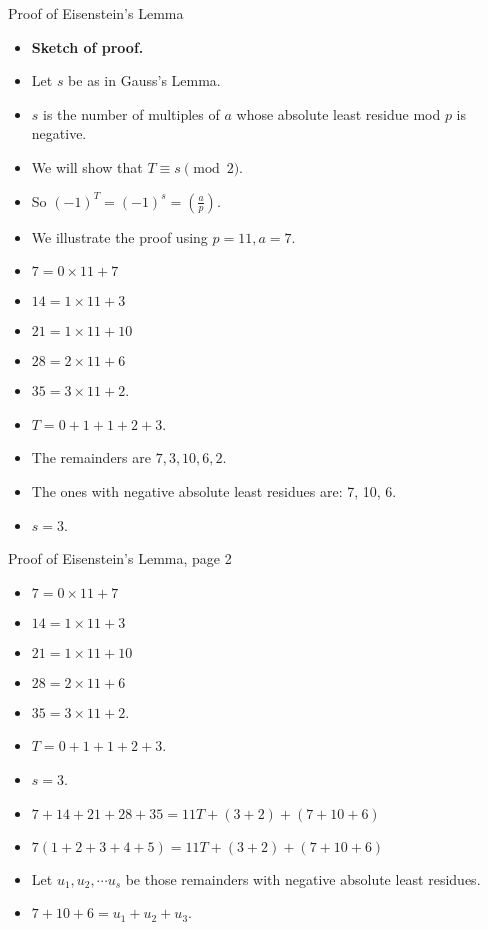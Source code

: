 \documentclass{beamer}
\begin{document}
\begin{frame}{Proof of Eisenstein's Lemma}

\begin{itemize}
  \item \textbf{Sketch of proof.}
  \item Let $s$ be as in Gauss's Lemma.
  \item $s$ is the number of multiples of $a$ whose absolute least residue mod $p$ is negative.
  \item We will show that $T \equiv s \pmod 2$.
  \item So $(-1)^T = (-1)^s = (\frac{a}{p})$.
  \item We illustrate the proof using $p=11, a=7$.
  \item $7 = 0\times 11 + 7$
  \item $14 = 1\times 11 + 3$
  \item $21 = 1\times 11 + 10$
  \item $28 = 2\times 11 + 6$
  \item $35 = 3\times 11 + 2$.
  \item $T = 0 + 1 + 1 + 2 + 3$.
  \item The remainders are $7,3,10,6,2$.
  \item The ones with negative absolute least residues are: 7, 10, 6.
  \item $s=3$.
\end{itemize}
\end{frame}



\begin{frame}{Proof of Eisenstein's Lemma, page 2}

\begin{itemize}
  \item $7 = 0\times 11 + 7$
  \item $14 = 1\times 11 + 3$
  \item $21 = 1\times 11 + 10$
  \item $28 = 2\times 11 + 6$
  \item $35 = 3\times 11 + 2$.
  \item $T = 0 + 1 + 1 + 2 + 3$.
  \item $s=3$.
  \item $7+14+21+28+35=11T + (3 + 2) + (7 + 10 + 6)$
  \item $7(1+2+3+4+5)=11T + (3 + 2) + (7 + 10 + 6)$
  \item Let $u_1, u_2, \cdots u_s$ be those remainders with negative absolute least residues.
  \item $7 + 10+ 6 = u_1 + u_2 + u_3 $.
\end{itemize}
\end{frame}
\end{document}
